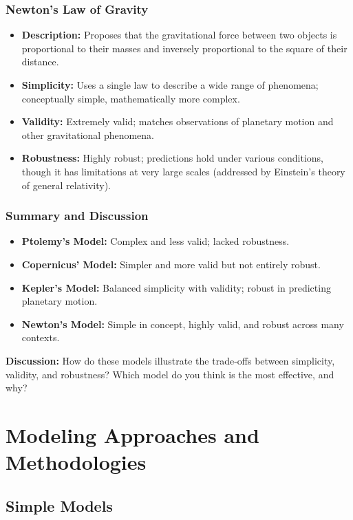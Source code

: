 \documentclass{beamer}
\begin{document}
%
\begin{frame}
\frametitle{Newton's Law of Gravity}
\begin{itemize}
    \item \textbf{Description:} Proposes that the gravitational force between two objects is proportional to their masses and inversely proportional to the square of their distance.
    \item \textbf{Simplicity:} Uses a single law to describe a wide range of phenomena; conceptually simple, mathematically more complex.
    \item \textbf{Validity:} Extremely valid; matches observations of planetary motion and other gravitational phenomena.
    \item \textbf{Robustness:} Highly robust; predictions hold under various conditions, though it has limitations at very large scales (addressed by Einstein's theory of general relativity).
\end{itemize}
\end{frame}
%
\begin{frame}
\frametitle{Summary and Discussion}
\begin{itemize}
    \item \textbf{Ptolemy's Model:} Complex and less valid; lacked robustness.
    \item \textbf{Copernicus' Model:} Simpler and more valid but not entirely robust.
    \item \textbf{Kepler's Model:} Balanced simplicity with validity; robust in predicting planetary motion.
    \item \textbf{Newton's Model:} Simple in concept, highly valid, and robust across many contexts.
\end{itemize}

\textbf{Discussion:} How do these models illustrate the trade-offs between simplicity, validity, and robustness? Which model do you think is the most effective, and why?
\end{frame}
%



%
\section{Modeling Approaches and Methodologies}
%

\subsection{Simple Models}
\end{document}
